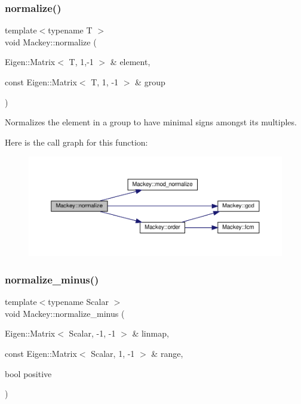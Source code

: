 \subsubsection{\texorpdfstring{normalize()}{normalize()}\hspace{0.1cm}{\footnotesize\ttfamily [2/2]}}
{\footnotesize\ttfamily template$<$typename T $>$ \\
void Mackey\+::normalize (\begin{DoxyParamCaption}\item[{Eigen\+::\+Matrix$<$ T, 1,-\/1 $>$ \&}]{element,  }\item[{const Eigen\+::\+Matrix$<$ T, 1, -\/1 $>$ \&}]{group }\end{DoxyParamCaption})}



Normalizes the element in a group to have minimal signs amongst its multiples. 

Here is the call graph for this function\+:\nopagebreak
\begin{figure}[H]
\begin{center}
\leavevmode
\includegraphics[width=350pt]{namespaceMackey_a635c87980358b97256fe159f0c59bb80_cgraph}
\end{center}
\end{figure}
\mbox{\label{namespaceMackey_a463bb762b4edc2f283e8d1c0c466aedf}} 
\subsubsection{\texorpdfstring{normalize\+\_\+minus()}{normalize\_minus()}}
{\footnotesize\ttfamily template$<$typename Scalar $>$ \\
void Mackey\+::normalize\+\_\+minus (\begin{DoxyParamCaption}\item[{Eigen\+::\+Matrix$<$ Scalar, -\/1, -\/1 $>$ \&}]{linmap,  }\item[{const Eigen\+::\+Matrix$<$ Scalar, 1, -\/1 $>$ \&}]{range,  }\item[{bool}]{positive }\end{DoxyParamCaption})}



